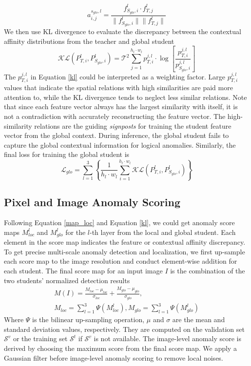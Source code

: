 \documentclass[10pt,twocolumn,letterpaper]{article}
\begin{document}
\begin{equation}
    a_{i, j}^{s_{glo}, l}=\frac{f_{S_{glo}, i}^l \cdot f_{T, j}^l}{\|f_{S_{glo}, i}^l\| \|f_{T, j}^l\|}
\end{equation}
We then use KL divergence to evaluate the discrepancy between the contextual affinity distributions from the teacher and global student
\begin{equation}
\label{kl}
    \mathcal{KL}(P_{T, i}^l, P_{S_{glo}, i}^l) =\mathcal{T}^2 \sum_{j=1}^{h_l \cdot w_l} p_{T, i}^{j, l}\cdot\log{\left[\frac{p_{T, i}^{j, l}}{p_{S_{glo}, i}^{j, l}}\right]}
\end{equation}
The $p_{T, i}^{j, l}$ in Equation \eqref{kl} could be interpreted as a weighting factor. Large $p_{T, i}^{j, l}$ values that indicate the spatial relations with high similarities are paid more attention to, while the KL divergence tends to neglect less similar relations. Note that since each feature vector always has the largest similarity with itself, it is not a contradiction with accurately reconstructing the feature vector. The high-similarity relations are the guiding \textit{signposts} for training the student feature vector from the global context. During inference, the global student fails to capture the global contextual information for logical anomalies. Similarly, the final loss for training the global student is 
\begin{equation}
    \mathcal{L}_{glo} = \sum_{l=1}^{3}\left\{\frac{1}{h_l \cdot w_l}\sum_{i=1}^{h_l \cdot w_l}\mathcal{KL}(P_{T, i}^l, P_{S_{glo}, i}^l)  \right\}
\end{equation}


\subsection{Pixel and Image Anomaly Scoring}
Following Equation \eqref{map_loc} and Equation \eqref{kl}, we could get anomaly score maps $M_{loc}^l$ and $M_{glo}^l$ for the $l$-th layer from the local and global student. Each element in the score map indicates the feature or contextual affinity discrepancy. To get precise multi-scale anomaly detection and localization, we first up-sample each score map to the image resolution and  conduct element-wise addition for each student. The final score map for an input image $I$ is the combination of the two students' normalized detection results
\begin{equation}
\begin{split}
      M(I) = \frac{M_{loc} - \mu_{loc}}{\sigma_{loc}} + \frac{M_{glo} - \mu_{glo}}{\sigma_{glo}},\\
    M_{loc} = \sum_{l = 1}^{3}\Psi(M_{loc}^{l}), M_{glo} = \sum_{l = 1}^{3}\Psi(M_{glo}^{l})  
\end{split}
\end{equation}
Where $\Psi$ is the bilinear up-sampling operation, $\mu$ and $\sigma$ are the mean and standard deviation values, respectively. They are computed on the validation set $\mathcal{S}^v$ or the training set $\mathcal{S}^t$ if $\mathcal{S}^v$ is not available. The image-level anomaly score is derived by choosing the maximum score from the final score map. We apply a Gaussian filter before image-level anomaly scoring to remove local noises.
\end{document}
